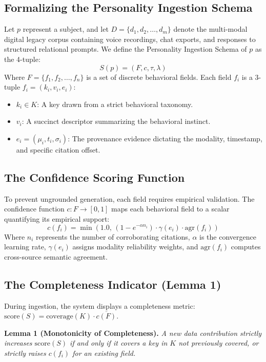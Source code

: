 \documentclass[journal]{IEEEtran}
\begin{document}
\subsection{Formalizing the Personality Ingestion Schema}
Let $p$ represent a subject, and let $D = \{d_1, d_2, \dots, d_m\}$ denote the multi-modal digital legacy corpus containing voice recordings, chat exports, and responses to structured relational prompts. We define the Personality Ingestion Schema of $p$ as the 4-tuple:
\begin{equation}
S(p) = (F, c, \tau, \lambda)
\end{equation}
Where $F = \{f_1, f_2, \dots, f_n\}$ is a set of discrete behavioral fields. Each field $f_i$ is a 3-tuple $f_i = (k_i, v_i, e_i)$:
\begin{itemize}
    \item $k_i \in K$: A key drawn from a strict behavioral taxonomy.
    \item $v_i$: A succinct descriptor summarizing the behavioral instinct.
    \item $e_i = (\mu_i, t_i, \sigma_i)$: The provenance evidence dictating the modality, timestamp, and specific citation offset.
\end{itemize}

\subsection{The Confidence Scoring Function}
To prevent ungrounded generation, each field requires empirical validation. The confidence function $c : F \to [0, 1]$ maps each behavioral field to a scalar quantifying its empirical support:
\begin{equation}
c(f_i) = \min\left(1.0, \, \left(1 - e^{-\alpha n_i}\right) \cdot \gamma(e_i) \cdot \text{agr}(f_i)\right)
\end{equation}
Where $n_i$ represents the number of corroborating citations, $\alpha$ is the convergence learning rate, $\gamma(e_i)$ assigns modality reliability weights, and $\text{agr}(f_i)$ computes cross-source semantic agreement.

\subsection{The Completeness Indicator (Lemma 1)}
During ingestion, the system displays a completeness metric: $\text{score}(S) = \text{coverage}(K) \cdot \overline{c(F)}$. 

\textbf{Lemma 1 (Monotonicity of Completeness).} \textit{A new data contribution strictly increases $\text{score}(S)$ if and only if it covers a key in $K$ not previously covered, or strictly raises $c(f_i)$ for an existing field.}
\end{document}
